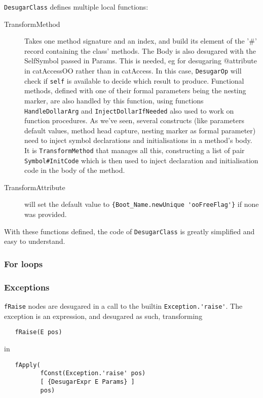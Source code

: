 \documentclass[a4paper]{memoir}
\begin{document}
\lstinline!DesugarClass! defines multiple local functions:
\begin{description}
  \item[TransformMethod] Takes one method signature and an index, and build its
    element of the '\#' record containing the class' methods. The Body is also desugared with the SelfSymbol passed in Params.
    This is needed, eg for desugaring @attribute in catAccessOO rather than in
    catAccess. In this case, \lstinline!DesugarOp! will check if
    \lstinline!self! is available to decide which result to produce.
    Functional methods, defined with one of their formal parameters being the
    nesting marker, are also handled by this function, using functions
    \lstinline!HandleDollarArg! and \lstinline!InjectDollarIfNeeded! also used
    to work on function procedures.
    As we've seen, several constructs (like parameters default values, method head capture, nesting marker
    as formal parameter) need to inject symbol declarations and initialisations
    in a method's body. It is \lstinline!TransformMethod! that manages all this,
    constructing a list of pair \lstinline!Symbol#InitCode! which is then used
    to inject declaration and initialisation code in the body of the method.
  \item[TransformAttribute] will set the default value to 
    \lstinline!{Boot_Name.newUnique 'ooFreeFlag'}! if none was provided.
\end{description}
With these functions defined, the code of \lstinline!DesugarClass! is greatly
simplified and easy to understand.

\subsubsection{For loops}
\subsubsection{Exceptions}\label{sec:arch:desugar:exceptions}
\lstinline!fRaise! nodes are desugared in a call to the builtin
\lstinline!Exception.'raise'!. The exception is an expression, and desugared as
such, transforming
\begin{lstlisting}
   fRaise(E pos)
\end{lstlisting}
in
\begin{lstlisting}
   fApply(
          fConst(Exception.'raise' pos) 
          [ {DesugarExpr E Params} ] 
          pos)
\end{lstlisting}
\end{document}

